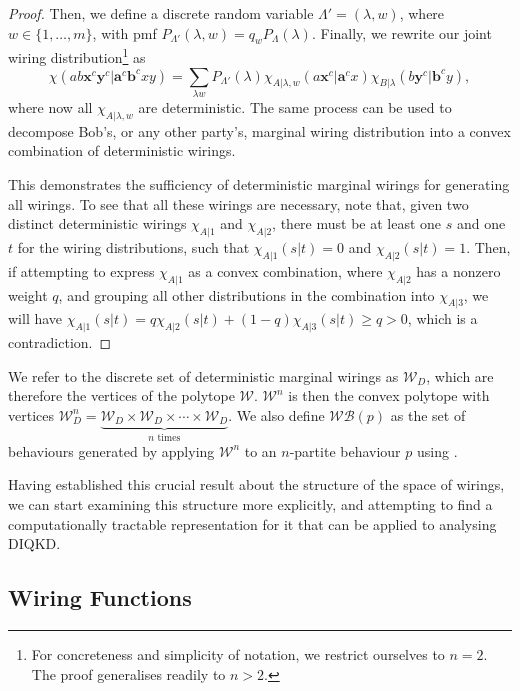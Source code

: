 \documentclass[10pt, a4paper]{article}
\numberwithin{equation}{section} %
\theoremstyle{definition}
\theoremstyle{plain}
\newcommand{\dintv}[2]{\mathopen\{#1,\ldots,#2\mathclose\}}
\newcommand{\?}{\mathrel{?}} %
\newcommand{\cvec}[1]{\boldsymbol{\mathbf{#1}}}    %
\newcommand{\sW}{\mathcal{W}}
\newcommand{\sWB}{\mathcal{WB}}
\begin{document}
\begin{proof}
                    Then, we define a discrete random variable \(\Lambda' = (\lambda, w)\), where \(w \in \dintv{1}{m}\), with pmf \(P_{\Lambda'}(\lambda, w) = q_w P_{\Lambda}(\lambda)\). Finally, we rewrite our joint wiring distribution\footnote{For concreteness and simplicity of notation, we restrict ourselves to \(n=2\). The proof generalises readily to \(n>2\).} as
                    \begin{equation}
                      \chi(ab\cvec{x}^c\cvec{y}^c|\cvec{a}^c\cvec{b}^cxy) = \sum_{\lambda w} P_{\Lambda'}(\lambda) \chi_{A|\lambda,w}(a\cvec{x}^c|\cvec{a}^cx) \chi_{B|\lambda}(b\cvec{y}^c|\cvec{b}^cy),
                    \end{equation}
                    where now all \(\chi_{A|\lambda,w}\) are deterministic. The same process can be used to decompose Bob's, or any other party's, marginal wiring distribution into a convex combination of deterministic wirings.

                    This demonstrates the sufficiency of deterministic marginal wirings for generating all wirings. To see that all these wirings are necessary, note that, given two distinct deterministic wirings \(\chi_{A|1}\) and \(\chi_{A|2}\), there must be at least one \(s\) and one \(t\) for the wiring distributions, such that \(\chi_{A|1}(s|t) = 0\) and \(\chi_{A|2}(s|t) = 1\). Then, if attempting to express \(\chi_{A|1}\) as a convex combination, where \(\chi_{A|2}\) has a nonzero weight \(q\), and grouping all other distributions in the combination into \(\chi_{A|3}\), we will have \(\chi_{A|1}(s|t) = q\chi_{A|2}(s|t) + (1-q)\chi_{A|3}(s|t) \geq q > 0\), which is a contradiction.
                  \end{proof}

              We refer to the discrete set of deterministic marginal wirings as \(\sW_D\), which are therefore the vertices of the polytope \(\sW\). \(\sW^n\) is then the convex polytope with vertices \(\sW_D^n = \underbrace{\sW_D \times \sW_D \times \cdots \times \sW_D}_{n\text{ times}}\). We also define \(\sWB(p)\) as the set of behaviours generated by applying \(\sW^n\) to an \(n\)-partite behaviour \(p\) using .

              Having established this crucial result about the structure of the space of wirings, we can start examining this structure more explicitly, and attempting to find a computationally tractable representation for it that can be applied to analysing DIQKD.

              \subsection{Wiring Functions}\label{sec:locwir_func}
\end{document}

